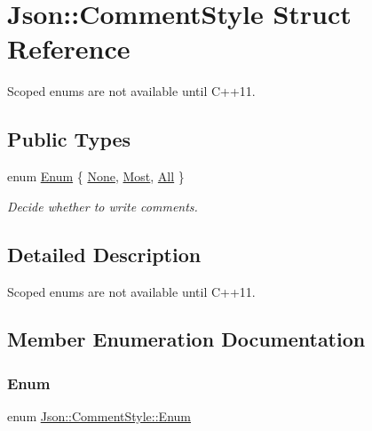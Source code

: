 \hypertarget{structJson_1_1CommentStyle}{}\section{Json\+:\+:Comment\+Style Struct Reference}
\label{structJson_1_1CommentStyle}


Scoped enums are not available until C++11.  


\subsection*{Public Types}
\begin{DoxyCompactItemize}
\item 
enum \hyperlink{structJson_1_1CommentStyle_a51fc08f3518fd81eba12f340d19a3d0c_a51fc08f3518fd81eba12f340d19a3d0c}{Enum} \{ \hyperlink{structJson_1_1CommentStyle_a51fc08f3518fd81eba12f340d19a3d0c_a51fc08f3518fd81eba12f340d19a3d0cac8b32a8bae63414c8647d4919da8d437}{None}, 
\hyperlink{structJson_1_1CommentStyle_a51fc08f3518fd81eba12f340d19a3d0c_a51fc08f3518fd81eba12f340d19a3d0cac65238f050773c107690a456e9c05c98}{Most}, 
\hyperlink{structJson_1_1CommentStyle_a51fc08f3518fd81eba12f340d19a3d0c_a51fc08f3518fd81eba12f340d19a3d0ca32302c0b97190c1808b3e38f367fef01}{All}
 \}\begin{DoxyCompactList}\small\item\em Decide whether to write comments. \end{DoxyCompactList}
\end{DoxyCompactItemize}


\subsection{Detailed Description}
Scoped enums are not available until C++11. 

\subsection{Member Enumeration Documentation}
\mbox{\label{structJson_1_1CommentStyle_a51fc08f3518fd81eba12f340d19a3d0c_a51fc08f3518fd81eba12f340d19a3d0c}} 
\subsubsection{\texorpdfstring{Enum}{Enum}}
{\footnotesize\ttfamily enum \hyperlink{structJson_1_1CommentStyle_a51fc08f3518fd81eba12f340d19a3d0c_a51fc08f3518fd81eba12f340d19a3d0c}{Json\+::\+Comment\+Style\+::\+Enum}}



